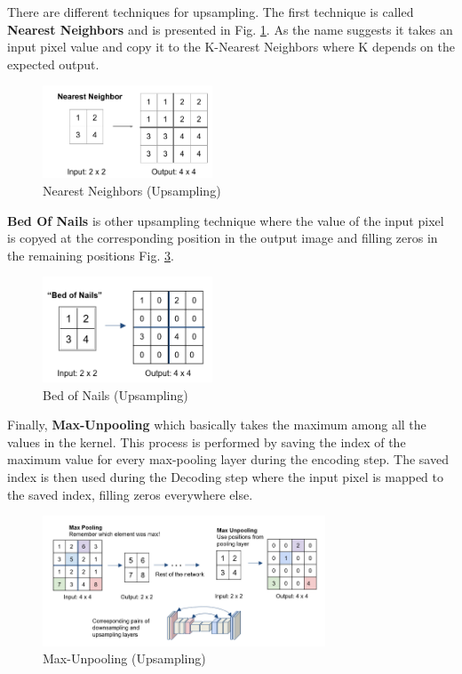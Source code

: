 \documentclass{article}
\begin{document}
There are different techniques for upsampling. The first technique is called \textbf{Nearest Neighbors} and is presented in Fig. \ref{fig:f5}. As the name suggests it takes an input pixel value and copy it to the K-Nearest Neighbors where K depends on the expected output.

\begin{figure}[ht]
    \centering
    \includegraphics[width=0.45\textwidth,height=0.45\textheight,keepaspectratio]{images/nn.png}
    \captionsetup{justification=centering}
    \caption{Nearest Neighbors (Upsampling)}
    \label{fig:f5}
\end{figure}

\textbf{Bed Of Nails} is other upsampling technique where the value of the input pixel is copyed at the corresponding position in the output image and filling zeros in the remaining positions Fig. \ref{fig:f6}.

\begin{figure}[ht]
    \centering
    \includegraphics[width=0.45\textwidth,height=0.45\textheight,keepaspectratio]{images/bn.png}
    \captionsetup{justification=centering}
    \caption{Bed of Nails (Upsampling)}
    \label{fig:f6}
\end{figure}

Finally, \textbf{Max-Unpooling} which basically takes the maximum among all the values in the kernel. This process is performed by saving the index of the maximum value for every max-pooling layer during the encoding step. The saved index is then used during the Decoding step where the input pixel is mapped to the saved index, filling zeros everywhere else.

\begin{figure}[ht]
    \centering
    \includegraphics[width=0.75\textwidth,height=0.75\textheight,keepaspectratio]{images/mn.png}
    \captionsetup{justification=centering}
    \caption{Max-Unpooling (Upsampling)}
    \label{fig:f6}
\end{figure}
\end{document}
